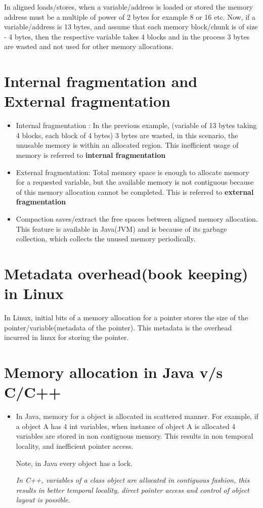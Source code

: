 \documentclass[twoside]{article}
\begin{document}
In aligned loads/stores, when a variable/address is loaded or stored the memory address must be a multiple of power of 2 bytes for example 8 or 16 etc. Now, if a variable/address is 13 bytes, and assume that each memory block/chunk is of  size - 4 bytes, then the respective variable takes 4 blocks and in the process 3 bytes are wasted and not used for other memory allocations.

\section{Internal fragmentation and External fragmentation}

\begin{itemize}
\item Internal fragmentation : In the previous example, (variable of 13 bytes taking 4 blocks, each block of 4 bytes) 3 bytes are wasted, in this scenario, the unusable memory is within an allocated region. This inefficient usage of memory is referred to {\bf internal fragmentation}

\item External fragmentation: Total memory space is enough to allocate memory for a requested variable, but the available memory is not contiguous because of this memory allocation cannot be completed. This is referred to {\bf external fragmentation}

\item Compaction saves/extract the free spaces between aligned memory allocation. This feature is available in Java(JVM) and is because of its garbage collection, which collects the unused memory periodically.

\end{itemize}

\section{Metadata overhead(book keeping) in Linux}

In Linux, initial bits of a memory allocation for a pointer stores the size of the pointer/variable(metadata of the pointer). This metadata is the overhead incurred in linux for storing the pointer.

\section{Memory allocation in Java v/s C/C++}

\begin{itemize}
\item In Java, memory for a object is allocated in scattered manner. For example, if a object A has 4 int variables, when instance of object A is allocated 4 variables are stored in non contiguous memory. This results in non temporal locality, and  inefficient pointer access. 

Note, in Java every object has a lock. 

\it In C++, variables of a class object are allocated in contiguous fashion, this results in better temporal locality, direct pointer access and control of object layout is possible.

\end{itemize}
\end{document}
